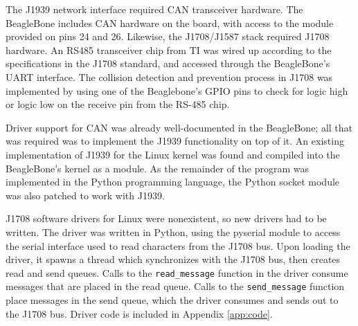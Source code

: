 The J1939 network interface required CAN transceiver hardware. The BeagleBone includes CAN hardware on the board, with access
to the module provided on pins 24 and 26. Likewise, the J1708/J1587 stack required J1708 hardware. An RS485 transceiver chip from TI
was wired up according to the specifications in the J1708 standard, and accessed through the BeagleBone's UART interface.
The collision detection and prevention process in J1708 was implemented by using one of the Beaglebone's GPIO pins
to check for logic high or logic low on the receive pin from the RS-485 chip.


Driver support for CAN was already well-documented in the BeagleBone; all that was required was to implement the J1939
functionality on top of it. An existing implementation of J1939 for the Linux kernel was found \cite{j1939linux} and compiled into
the BeagleBone's kernel as a module. As the remainder of the program was implemented in the Python programming language,
the Python socket module was also patched to work with J1939.

J1708 software drivers for Linux were nonexistent, so new drivers had to be written. The driver was written in Python, using the pyserial
module to access the serial interface used to read characters from the J1708 bus. Upon loading the driver, it spawns a thread which synchronizes
with the J1708 bus, then creates read and send queues. Calls to the \texttt{read\_message} function in the driver consume messages that are placed in the
read queue. Calls to the \texttt{send\_message} function place messages in the send queue, which the driver consumes and sends out to the J1708 bus.
Driver code is included in Appendix \ref{app:code}.

